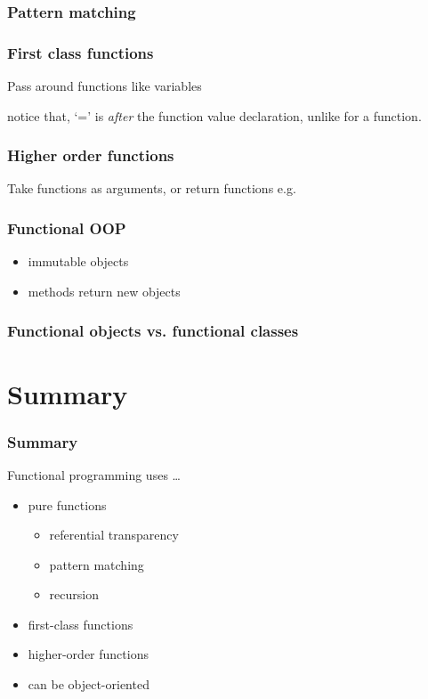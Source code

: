 \documentclass[xcolor={dvipsnames}]{beamer}
\begin{document}
\begin{frame}
  \frametitle{Pattern matching}
  
\end{frame}

\begin{frame}[fragile]
  \frametitle{First class functions}
  Pass around functions like variables
  
  notice that, ‘=’ is \textit{after} the function value declaration, unlike for a function.
\end{frame}

\begin{frame}[fragile]
  \frametitle{Higher order functions}
  Take functions as arguments, or return functions e.g.
  
\end{frame}

\begin{frame}
  \frametitle{Functional OOP}
  \begin{itemize}
    \item immutable objects
    \item methods return new objects
  \end{itemize}
\end{frame}

\begin{frame}[fragile]
  \frametitle{Functional objects vs. functional classes}
  
\end{frame}

\section{Summary}

\begin{frame}
  \frametitle{Summary}
  Functional programming uses \ldots
  \begin{itemize}
  	\item<1-> pure functions
  	\begin{itemize}
  	  \item<2-> referential transparency
     	\item<2-> pattern matching
      \item<2-> recursion
  	\end{itemize}
  	\item<3-> first-class functions
    \item<4-> higher-order functions
    \item<5-> can be object-oriented
  \end{itemize}
\end{frame}
\end{document}
